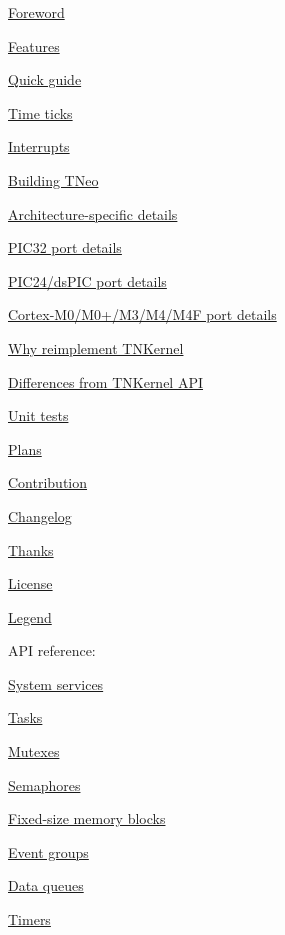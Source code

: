 \begin{DoxyItemize}
\item \hyperlink{foreword}{Foreword}
\item \hyperlink{features}{Features}
\item \hyperlink{quick_guide}{Quick guide}
\item \hyperlink{time_ticks}{Time ticks}
\item \hyperlink{interrupts}{Interrupts}
\item \hyperlink{building}{Building T\+Neo}
\item \hyperlink{arch_specific}{Architecture-\/specific details}
\begin{DoxyItemize}
\item \hyperlink{arch_specific_pic32_details}{P\+I\+C32 port details}
\item \hyperlink{arch_specific_pic24_details}{P\+I\+C24/ds\+P\+IC port details}
\item \hyperlink{arch_specific_cortex_m_details}{Cortex-\/\+M0/\+M0+/\+M3/\+M4/\+M4F port details}
\end{DoxyItemize}
\item \hyperlink{why_reimplement}{Why reimplement T\+N\+Kernel}
\item \hyperlink{tnkernel_diff}{Differences from T\+N\+Kernel A\+PI}
\item \hyperlink{unit_tests}{Unit tests}
\item \hyperlink{plans}{Plans}
\item \hyperlink{contribution}{Contribution}
\item \hyperlink{changelog}{Changelog}
\item \hyperlink{thanks}{Thanks}
\item \hyperlink{license}{License}
\item \hyperlink{legend}{Legend}
\end{DoxyItemize}

A\+PI reference\+:


\begin{DoxyItemize}
\item \hyperlink{tn__sys_8h}{System services}
\item \hyperlink{tn__tasks_8h}{Tasks}
\item \hyperlink{tn__mutex_8h}{Mutexes}
\item \hyperlink{tn__sem_8h}{Semaphores}
\item \hyperlink{tn__fmem_8h}{Fixed-\/size memory blocks}
\item \hyperlink{tn__eventgrp_8h}{Event groups}
\item \hyperlink{tn__dqueue_8h}{Data queues}
\item \hyperlink{tn__timer_8h}{Timers} 
\end{DoxyItemize}